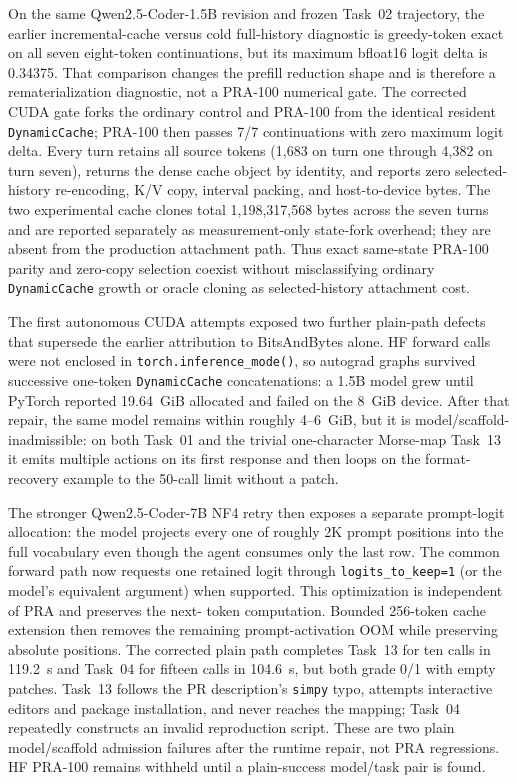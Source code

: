 \documentclass[11pt]{article}
\begin{document}
On the same Qwen2.5-Coder-1.5B revision and frozen Task~02 trajectory, the
earlier incremental-cache versus cold full-history diagnostic is greedy-token
exact on all seven eight-token continuations, but its maximum bfloat16 logit
delta is 0.34375.  That comparison changes the prefill reduction shape and is
therefore a rematerialization diagnostic, not a PRA-100 numerical gate.  The
corrected CUDA gate forks the ordinary control and PRA-100 from the identical
resident \texttt{DynamicCache}; PRA-100 then passes 7/7 continuations with
zero maximum logit delta.  Every turn retains all source tokens (1,683 on turn
one through 4,382 on turn seven), returns the dense cache object by identity,
and reports zero selected-history re-encoding, K/V copy, interval packing, and
host-to-device bytes.  The two experimental cache clones total 1,198,317,568
bytes across the seven turns and are reported separately as measurement-only
state-fork overhead; they are absent from the production attachment path.
Thus exact same-state PRA-100 parity and zero-copy selection coexist without
misclassifying ordinary \texttt{DynamicCache} growth or oracle cloning as
selected-history attachment cost.

The first autonomous CUDA attempts exposed two further plain-path defects that
supersede the earlier attribution to BitsAndBytes alone.  HF forward calls were
not enclosed in \texttt{torch.inference\_mode()}, so autograd graphs survived
successive one-token \texttt{DynamicCache} concatenations: a 1.5B model grew
until PyTorch reported 19.64~GiB allocated and failed on the 8~GiB device.
After that repair, the same model remains within roughly 4--6~GiB, but it is
model/scaffold-inadmissible: on both Task~01 and the trivial one-character
Morse-map Task~13 it emits multiple actions on its first response and then
loops on the format-recovery example to the 50-call limit without a patch.

The stronger Qwen2.5-Coder-7B NF4 retry then exposes a separate prompt-logit
allocation: the model projects every one of roughly 2K prompt positions into
the full vocabulary even though the agent consumes only the last row.  The
common forward path now requests one retained logit through
\texttt{logits\_to\_keep=1} (or the model's equivalent argument) when
supported.  This optimization is independent of PRA and preserves the next-
token computation.  Bounded 256-token cache extension then removes the
remaining prompt-activation OOM while preserving absolute positions.  The
corrected plain path completes Task~13 for ten calls in 119.2~s and Task~04 for
fifteen calls in 104.6~s, but both grade 0/1 with empty patches.  Task~13
follows the PR description's \texttt{simpy} typo, attempts interactive editors
and package installation, and never reaches the mapping; Task~04 repeatedly
constructs an invalid reproduction script.  These are two plain
model/scaffold admission failures after the runtime repair, not PRA
regressions.  HF PRA-100 remains withheld until a plain-success model/task pair
is found.
\end{document}

